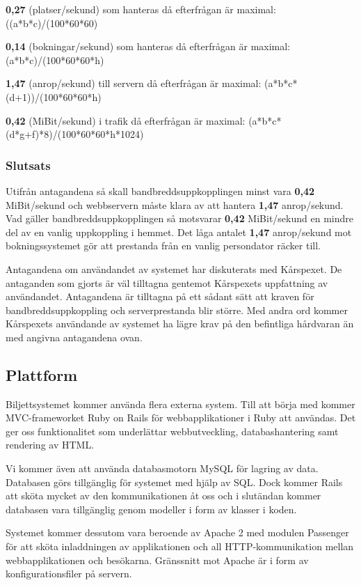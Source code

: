 \documentclass[a4paper, twoside, 11pt, titlepage]{article}
\begin{document}
		\textbf{0,27} (platser/sekund) som hanteras då efterfrågan är maximal: ((a*b*c)/(100*60*60)

		\textbf{0,14} (bokningar/sekund) som hanteras då efterfrågan är maximal: (a*b*c)/(100*60*60*h)

		\textbf{1,47} (anrop/sekund) till servern då efterfrågan är maximal: (a*b*c*(d+1))/(100*60*60*h)

		\textbf{0,42} (MiBit/sekund) i trafik då efterfrågan är maximal: (a*b*c*(d*g+f)*8)/(100*60*60*h*1024)

		\subsubsection{Slutsats}


		Utifrån antagandena så skall bandbreddsuppkopplingen minst vara \textbf{0,42} MiBit/sekund och webbservern måste klara av att hantera \textbf{1,47} anrop/sekund. Vad gäller bandbreddsuppkopplingen så motsvarar \textbf{0,42} MiBit/sekund en mindre del av en vanlig uppkoppling i hemmet. Det låga antalet \textbf{1,47} anrop/sekund mot bokningssystemet gör att prestanda från en vanlig persondator räcker till.

		Antagandena om användandet av systemet har diskuterats med Kårspexet. De antaganden som gjorts är väl tilltagna gentemot Kårspexets uppfattning av användandet. Antagandena är tilltagna på ett sådant sätt att kraven för bandbreddsuppkoppling och serverprestanda blir större. Med andra ord kommer Kårspexets användande av systemet ha lägre krav på den befintliga hårdvaran än med angivna antagandena ovan.

	\subsection{Plattform}


	Biljettsystemet kommer använda flera externa system. Till att börja med kommer MVC-frameworket Ruby on Rails för webbapplikationer i Ruby att användas. Det ger oss funktionalitet som underlättar webbutveckling, databashantering samt rendering av HTML.

	Vi kommer även att använda databasmotorn MySQL för lagring av data. Databasen görs tillgänglig för systemet med hjälp av SQL. Dock kommer Rails att sköta mycket av den kommunikationen åt oss och i slutändan kommer databasen vara tillgänglig genom modeller i form av klasser i koden. 

	Systemet kommer dessutom vara beroende av Apache 2 med modulen Passenger för att sköta inladdningen av applikationen och all HTTP-kommunikation mellan webbapplikationen och besökarna. Gränssnitt mot Apache är i form av konfigurationsfiler på servern. 
\end{document}
